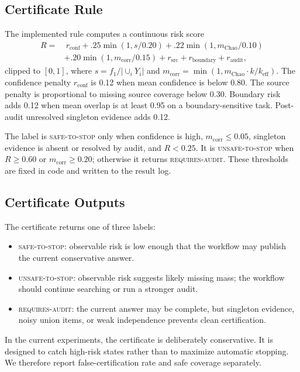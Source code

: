 \documentclass[letterpaper]{article}
\begin{document}
\subsection{Certificate Rule}

The implemented rule computes a continuous risk score
\begin{align}
R = &\ r_{\text{conf}} + .25\min(1,s/0.20)
      + .22\min(1,m_{\text{Chao}}/0.10) \nonumber\\
    &+ .20\min(1,m_{\text{corr}}/0.15)
      + r_{\text{src}} + r_{\text{boundary}} + r_{\text{audit}},
\end{align}
clipped to $[0,1]$, where $s=f_1/|\cup_iY_i|$ and
$m_{\text{corr}}=\min(1,m_{\text{Chao}}\cdot k/k_{\text{eff}})$. The confidence
penalty $r_{\text{conf}}$ is 0.12 when mean confidence is below 0.80. The source
penalty is proportional to missing source coverage below 0.30. Boundary risk
adds 0.12 when mean overlap is at least 0.95 on a boundary-sensitive task.
Post-audit unresolved singleton evidence adds 0.12.

The label is \textsc{safe-to-stop} only when confidence is high,
$m_{\text{corr}}\le0.05$, singleton evidence is absent or resolved by audit, and
$R<0.25$. It is \textsc{unsafe-to-stop} when $R\ge0.60$ or
$m_{\text{corr}}\ge0.20$; otherwise it returns \textsc{requires-audit}. These
thresholds are fixed in code and written to the result log.

\subsection{Certificate Outputs}

The certificate returns one of three labels:

\begin{itemize}
    \item \textsc{safe-to-stop}: observable risk is low enough that the workflow
    may publish the current conservative answer.
    \item \textsc{unsafe-to-stop}: observable risk suggests likely missing
    mass; the workflow should continue searching or run a stronger audit.
    \item \textsc{requires-audit}: the current answer may be complete, but
    singleton evidence, noisy union items, or weak independence prevents clean
    certification.
\end{itemize}

In the current experiments, the certificate is deliberately conservative. It is
designed to catch high-risk states rather than to maximize automatic stopping.
We therefore report false-certification rate and safe coverage separately.
\end{document}
